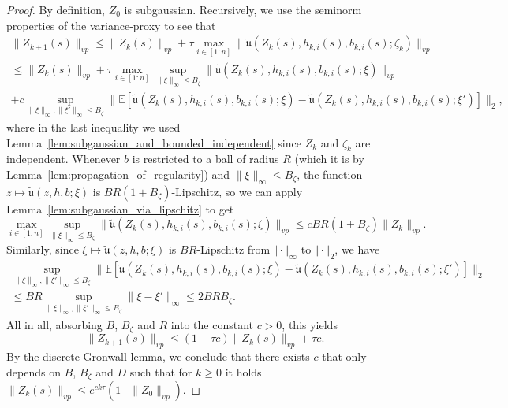 \documentclass[10pt,a4paper]{amsart}
\newcommand{\E}{\mathbb{E}}
\begin{document}
\begin{proof}
By definition, $Z_0$ is subgaussian. Recursively, we use the seminorm properties of the variance-proxy to see that
\begin{multline*}
    \|Z_{k+1}(s)\|_{vp} \le \|Z_k(s)\|_{vp} + \tau \max_{i \in [1:n]} \|\tilde{\mathfrak{u}}(Z_k(s), h_{k,i}(s), b_{k,i}(s){;\zeta_k})\|_{vp}\\
    \le \|Z_k(s)\|_{vp} + \tau \max_{i \in [1:n]}\sup_{\|\xi\|_{\infty}\leq B_\zeta} \|\tilde{\mathfrak{u}}(Z_k(s), h_{k,i}(s), b_{k,i}(s){;\xi})\|_{vp} \\{+ c\sup_{\|\xi\|_{\infty}, \|\xi'\|_{\infty}\leq B_\zeta} \|\E[\tilde{\mathfrak{u}}(Z_k(s), h_{k,i}(s), b_{k,i}(s){;\xi}) - \tilde{\mathfrak{u}}(Z_k(s), h_{k,i}(s), b_{k,i}(s){;\xi'})]\|_{2},}
\end{multline*}
where in the last inequality we used Lemma~\ref{lem:subgaussian_and_bounded_independent} since $Z_k$ and $\zeta_k$ are independent.
{Whenever $b$ is restricted to a ball of radius $R$ (which it is by Lemma~\ref{lem:propagation_of_regularity}) and $\|\xi\|_\infty \leq B_\zeta$, the function $z \mapsto \tilde{\mathfrak{u}}(z,h,b;\xi)$ is $BR(1+B_\zeta)$-Lipschitz, so we can apply Lemma~\ref{lem:subgaussian_via_lipschitz}} to get
\[{\max_{i \in [1:n]}\sup_{\|\xi\|_{\infty}\leq B_\zeta} \|\tilde{\mathfrak{u}}(Z_k(s), h_{k,i}(s), b_{k,i}(s){;\xi})\|_{vp} \leq cBR(1+B_\zeta)\|Z_k\|_{vp}}.\]
Similarly, since $\xi \mapsto \tilde{\mathfrak{u}}(z,h,b;\xi)$ is $BR$-Lipschitz from $\Vert\cdot\Vert_\infty$ to $\Vert\cdot\Vert_2$, we have
\begin{multline*}
    \sup_{\|\xi\|_{\infty}, \|\xi'\|_{\infty}\leq B_\zeta} \|\E[\tilde{\mathfrak{u}}(Z_k(s), h_{k,i}(s), b_{k,i}(s){;\xi}) - \tilde{\mathfrak{u}}(Z_k(s), h_{k,i}(s), b_{k,i}(s){;\xi'})]\|_{2} \\\leq BR\sup_{\|\xi\|_{\infty}, \|\xi'\|_{\infty}\leq B_\zeta}\|\xi - \xi'\|_\infty \leq 2BRB_\zeta.
\end{multline*}
All in all, absorbing $B$, $B_\zeta$ and $R$ into the constant $c >0$, this yields
\[{\|Z_{k+1}(s)\|_{vp} \le (1+\tau c)\|Z_k(s)\|_{vp} + \tau c.}\]
{By the discrete Gronwall lemma, we conclude that there exists $c$ that only depends on $B$, $B_\zeta$ and $D$ such that for $k \ge 0$ it holds $\|Z_k(s)\|_{vp} \leq e^{c k \tau} (1+\|Z_0\|_{vp})$}.
\end{proof}
\end{document}
